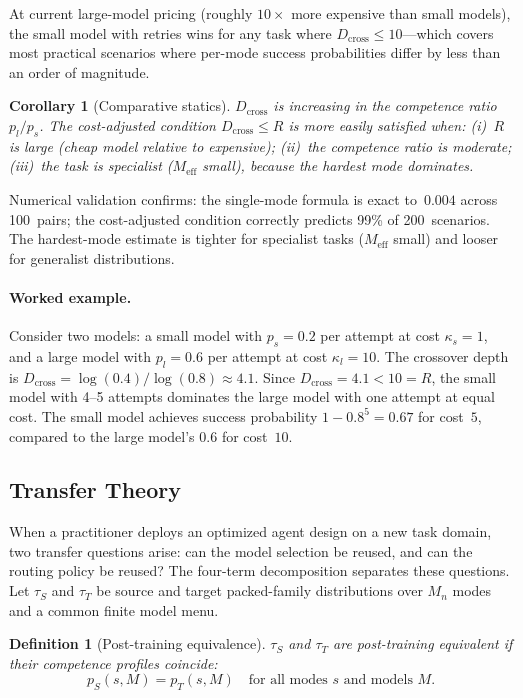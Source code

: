 \documentclass[twoside,11pt]{article}
\newtheorem{corollary}{Corollary}
\newtheorem{definition}{Definition}
\newcommand{\Mn}{M_n}
\newcommand{\Meff}{M_{\mathrm{eff}}}
\newcommand{\Dcross}{D_{\mathrm{cross}}}
\begin{document}
At current large-model pricing (roughly $10\times$ more expensive than small models), the small model with retries wins for any task where $\Dcross \le 10$---which covers most practical scenarios where per-mode success probabilities differ by less than an order of magnitude.

\begin{corollary}[Comparative statics]
\label{cor:crossover-statics}
$\Dcross$ is increasing in the competence ratio $p_l/p_s$.
The cost-adjusted condition $\Dcross \le R$ is more easily satisfied when: (i)~$R$ is large (cheap model relative to expensive); (ii)~the competence ratio is moderate; (iii)~the task is specialist ($\Meff$ small), because the hardest mode dominates.
\end{corollary}

Numerical validation confirms: the single-mode formula is exact to~$0.004$ across 100~pairs; the cost-adjusted condition correctly predicts 99\% of 200~scenarios.
The hardest-mode estimate is tighter for specialist tasks ($\Meff$ small) and looser for generalist distributions.

\paragraph{Worked example.}
Consider two models: a small model with $p_s = 0.2$ per attempt at cost $\kappa_s = 1$, and a large model with $p_l = 0.6$ per attempt at cost $\kappa_l = 10$.
The crossover depth is $\Dcross = \log(0.4)/\log(0.8) \approx 4.1$.
Since $\Dcross = 4.1 < 10 = R$, the small model with 4--5 attempts dominates the large model with one attempt at equal cost.
The small model achieves success probability $1 - 0.8^5 = 0.67$ for cost~$5$, compared to the large model's $0.6$ for cost~$10$.

\subsection{Transfer Theory}
\label{sec:transfer}

When a practitioner deploys an optimized agent design on a new task domain, two transfer questions arise: can the model selection be reused, and can the routing policy be reused?
The four-term decomposition separates these questions.
Let \(\tau_S\) and \(\tau_T\) be source and target packed-family distributions over \(\Mn\) modes and a common finite model menu.

\begin{definition}[Post-training equivalence]
\label{def:pt-equiv}
\(\tau_S\) and \(\tau_T\) are \emph{post-training equivalent} if their competence profiles coincide:
\[
  p_S(s,M)=p_T(s,M)
  \quad\text{for all modes }s\text{ and models }M .
\]
\end{definition}
\end{document}
